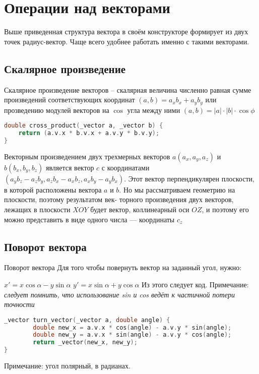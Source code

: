 \section{Операции над векторами}
Выше приведенная структура вектора в своём конструкторе формирует из двух точек радиус-вектор. Чаще всего удобнее работать именно с такими векторами.\newline
\subsection{Скалярное произведение}
Скалярное произведение векторов – скалярная величина численно равная сумме произведений соответствующих координат\newline
$(a,b) = a_xb_x + a_yb_y$\newline
или прозведению модулей векторов на $\cos$ угла между ними\newline
$(a,b) = |a|\cdot |b|\cdot \cos{\phi}$\newline
\begin{lstlisting}[language=C++]
double cross_product(_vector a, _vector b) {
	return (a.v.x * b.v.x + a.v.y * b.v.y);
}
\end{lstlisting}
Векторным произведением двух трехмерных векторов $a(a_x, a_y, a_z)$ и $b(b_x, b_y, b_z)$ является вектор $c$ с координатами $(a_yb_z - a_zb_y, a_zb_x - a_xb_z, a_xb_y - a_yb_x)$. Этот вектор перпендикулярен плоскости, в которой
расположены вектора $a$ и $b$. Но мы рассматриваем геометрию на плоскости, поэтому результатом век-
торного произведения двух векторов, лежащих в плоскости $XOY$ будет вектор, коллинеарный оси $OZ$, и поэтому его можно представить в виде одного числа — координаты $c_z$
\subsection{Поворот вектора}
Поворот вектора 
Для того чтобы повернуть вектор на заданный угол, нужно:\newline

$x' = x\cos{\alpha} - y\sin{\alpha}$\newline
$y' = x\sin{\alpha} + y\cos{\alpha}$\newline
Из этого следует код.\newline
Примечание: \textit{следует помнить, что использование sin и cos ведёт к частичной потери точности}
\begin{lstlisting}[language=C++]
_vector turn_vector(_vector a, double angle) {
    	double new_x = a.v.x * cos(angle) - a.v.y * sin(angle);
    	double new_y = a.v.x * sin(angle) - a.v.y * cos(angle);
    	return _vector(new_x, new_y);
}
\end{lstlisting}
Примечание: угол полярный, в радианах.